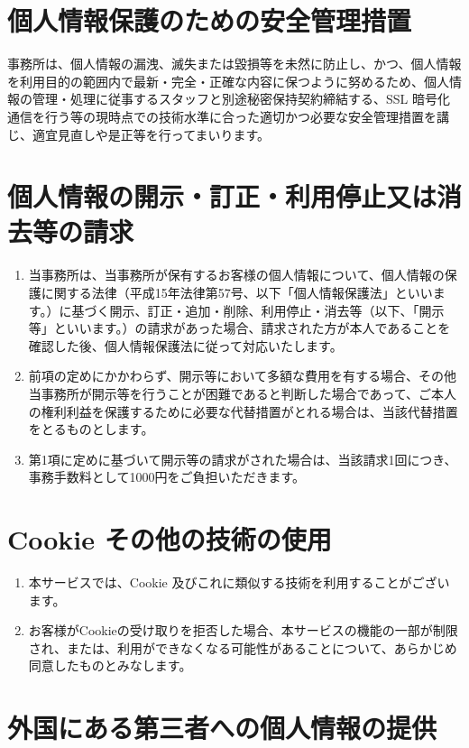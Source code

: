 \documentclass[a4j,titlepage]{ltjsarticle}
\begin{document}
\section{個人情報保護のための安全管理措置}
事務所は、個人情報の漏洩、滅失または毀損等を未然に防止し、かつ、個人情報を利用目的の範囲内で最新・完全・正確な内容に保つように努めるため、個人情報の管理・処理に従事するスタッフと別途秘密保持契約締結する、SSL 暗号化通信を行う等の現時点での技術水準に合った適切かつ必要な安全管理措置を講じ、適宜見直しや是正等を行ってまいります。

\section{個人情報の開示・訂正・利用停止又は消去等の請求}
\begin{enumerate}
	\item 当事務所は、当事務所が保有するお客様の個⼈情報について、個人情報の保護に関する法律（平成15年法律第57号、以下「個人情報保護法」といいます。）に基づく開⽰、訂正・追加・削除、利⽤停⽌・消去等（以下、「開示等」といいます。）の請求があった場合、請求された⽅が本⼈であることを確認した後、個⼈情報保護法に従って対応いたします。
	\item 前項の定めにかかわらず、開示等において多額な費用を有する場合、その他当事務所が開示等を行うことが困難であると判断した場合であって、ご本人の権利利益を保護するために必要な代替措置がとれる場合は、当該代替措置をとるものとします。
	\item 第1項に定めに基づいて開示等の請求がされた場合は、当該請求1回につき、事務手数料として1000円をご負担いただきます。
\end{enumerate}

\section{Cookie その他の技術の使用}
\begin{enumerate}
	\item 本サービスでは、Cookie 及びこれに類似する技術を利用することがございます。
	\item お客様がCookieの受け取りを拒否した場合、本サービスの機能の一部が制限され、または、利用ができなくなる可能性があることについて、あらかじめ同意したものとみなします。
\end{enumerate}


\section{外国にある第三者への個人情報の提供}
\end{document}
